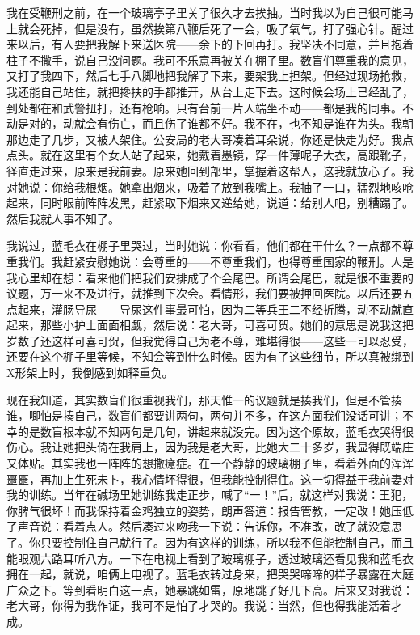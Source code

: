我在受鞭刑之前，在一个玻璃亭子里关了很久才去挨抽。当时我以为自己很可能马上就会死掉，但是没有，虽然挨第八鞭后死了一会，吸了氧气，打了强心针。醒过来以后，有人要把我解下来送医院——余下的下回再打。我坚决不同意，并且抱着柱子不撒手，说自己没问题。我可不乐意再被关在棚子里。数盲们尊重我的意见，又打了我四下，然后七手八脚地把我解了下来，要架我上担架。但经过现场抢救，我还能自己站住，就把搀扶的手都推开，从台上走下去。这时候会场上已经乱了，到处都在和武警扭打，还有枪响。只有台前一片人端坐不动——都是我的同事。不动是对的，动就会有伤亡，而且伤了谁都不好。我不在，也不知是谁在为头。我朝那边走了几步，又被人架住。公安局的老大哥凑着耳朵说，你还是快走为好。我点点头。就在这里有个女人站了起来，她戴着墨镜，穿一件薄呢子大衣，高跟靴子，径直走过来，原来是我前妻。原来她回到部里，掌握着这帮人，这我就放心了。我对她说：你给我根烟。她拿出烟来，吸着了放到我嘴上。我抽了一口，猛烈地咳呛起来，同时眼前阵阵发黑，赶紧取下烟来又递给她，说道：给别人吧，别糟蹋了。然后我就人事不知了。 

我说过，蓝毛衣在棚子里哭过，当时她说：你看看，他们都在干什么？一点都不尊重我们。我赶紧安慰她说：会尊重的——不尊重我们，也得尊重国家的鞭刑。人是我心里却在想：看来他们把我们安排成了个会尾巴。所谓会尾巴，就是很不重要的议题，万一来不及进行，就推到下次会。看情形，我们要被押回医院。以后还要五点起来，灌肠导尿——导尿这件事最可怕，因为二等兵王二不经折腾，动不动就直起来，那些小护士面面相觑，然后说：老大哥，可喜可贺。她们的意思是说我这把岁数了还这样可喜可贺，但我觉得自己为老不尊，难堪得很——这些一可以忍受，还要在这个棚子里等候，不知会等到什么时候。因为有了这些细节，所以真被绑到X形架上时，我倒感到如释重负。 

现在我知道，其实数盲们很重视我们，那天惟一的议题就是揍我们，但是不管揍谁，唧怕是揍自己，数盲们都要讲两句，两句并不多，在这方面我们没话可讲；不幸的是数盲根本就不知两句是几句，讲起来就没完。因为这个原故，蓝毛衣哭得很伤心。我让她把头倚在我肩上，因为我是老大哥，比她大二十多岁，我显得既端庄又体贴。其实我也一阵阵的想撒癔症。在一个静静的玻璃棚子里，看着外面的浑浑噩噩，再加上生死未卜，我心情坏得很，但我能控制得住。这一切得益于我前妻对我的训练。当年在碱场里她训练我走正步，喊了“一！”后，就这样对我说：王犯，你脾气很坏！而我保持着金鸡独立的姿势，朗声答道：报告管教，一定改！她压低了声音说：看着点人。然后凑过来吻我一下说：告诉你，不准改，改了就没意思了。你只要控制住自己就行了。因为有这样的训练，所以我不但能控制自己，而且能眼观六路耳听八方。一下在电视上看到了玻璃棚子，透过玻璃还看见我和蓝毛衣拥在一起，就说，咱俩上电视了。蓝毛衣转过身来，把哭哭啼啼的样子暴露在大庭广众之下。等到看明白这一点，她暴跳如雷，原地跳了好几下高。后来又对我说：老大哥，你得为我作证，我可不是怕了才哭的。我说：当然，但也得我能活着才成。 

